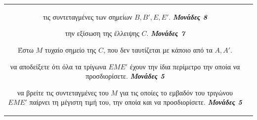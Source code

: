 \documentclass[11pt,a4paper,twoside]{book}
\newcommand{\monades}[1]{
\hspace*{\fill}
\textbf{\textit{\textcolor{maincolor}{Μονάδες #1}}}}
\begin{document}
\begin{tabular}{cc}
\begin{alist}    \item τις συντεταγμένες των σημείων $B, B', E, E'$. \monades{8}
    \item την εξίσωση της έλλειψης $C$. \monades{7}
    \item Έστω $M$ τυχαίο σημείο της $C$, που δεν ταυτίζεται με κάποιο από τα $A, A'$.
    \begin{rlist}
        \item να αποδείξετε ότι όλα τα τρίγωνα $EME'$ έχουν την ίδια περίμετρο την οποία να προσδιορίσετε. \monades{5}

        \item να βρείτε τις συντεταγμένες του $M$ για τις οποίες το εμβαδόν του τριγώνου $EME'$ παίρνει τη μέγιστη τιμή του, την οποία και να προσδιορίσετε. \monades{5}
    \end{rlist}\end{alist}


\end{tabular}
\end{document}

